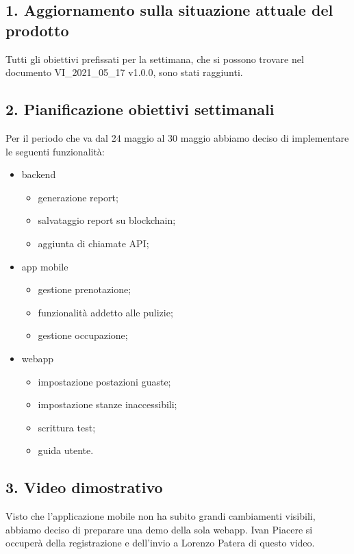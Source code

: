 \subsection*{\hypertarget{link1}{1. Aggiornamento sulla situazione attuale del prodotto}}
Tutti gli obiettivi prefissati per la settimana, che si possono trovare nel documento VI\_2021\_05\_17 v1.0.0, sono stati raggiunti.
\subsection*{2. Pianificazione obiettivi settimanali}
Per il periodo che va dal 24 maggio al 30 maggio abbiamo deciso di implementare le seguenti funzionalità:
\begin{itemize}
	\item backend
	\begin{itemize}
		\item generazione report;
		\item salvataggio report su blockchain;
		\item aggiunta di chiamate API;
	\end{itemize}
	\item app mobile
	\begin{itemize}
		\item gestione prenotazione;
		\item funzionalità addetto alle pulizie;
		\item gestione occupazione;
	\end{itemize}
	\item webapp
	\begin{itemize}
		\item impostazione postazioni guaste;
		\item impostazione stanze inaccessibili;
		\item scrittura test;
		\item guida utente.
	\end{itemize}
\end{itemize}
\subsection*{3. Video dimostrativo}
Visto che l'applicazione mobile non ha subito grandi cambiamenti visibili, abbiamo deciso di preparare una demo della sola webapp. Ivan Piacere si occuperà della registrazione e dell'invio a Lorenzo Patera di questo video.
